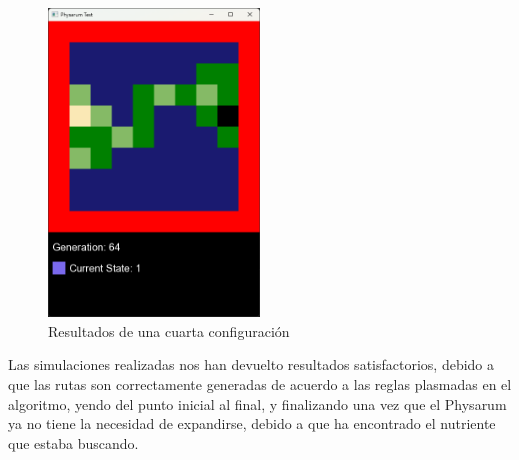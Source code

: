     \begin{figure}[htbp]
        \centering
        \includegraphics[width=0.5\textwidth]{./images/Pruebas/simulador/image006.png}
        \caption{Resultados de una cuarta configuraci\'on}
        \label{fig:conf4}
    \end{figure}
    \vskip 0.5cm
    Las simulaciones realizadas nos han devuelto resultados
        satisfactorios, debido a que las rutas son correctamente
        generadas de acuerdo a las reglas plasmadas en el algoritmo,
        yendo del punto inicial al final, y finalizando una vez que el
        Physarum ya no tiene la necesidad de expandirse, debido a
        que ha encontrado el nutriente que estaba buscando.
    \clearpage
